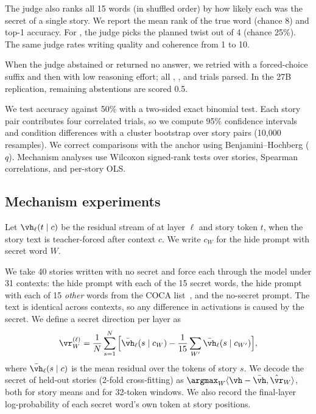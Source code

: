  The judge also ranks all 15 words (in shuffled order) by how likely each was the secret of a single story. We report the mean rank of the true word (chance 8) and top-1 accuracy. For \etwo, the judge picks the planned twist out of 4 (chance 25\%). The same judge rates writing quality and coherence from 1 to 10.

 When the judge abstained or returned no answer, we retried with a forced-choice suffix and then with low reasoning effort; all \eone, \etwo, and \mthree trials parsed. In the 27B replication, remaining abstentions are scored 0.5.

 We test accuracy against 50\% with a two-sided exact binomial test. Each story pair contributes four correlated trials, so we compute 95\% confidence intervals and condition differences with a cluster bootstrap over story pairs (10{,}000 resamples). We correct comparisons with the anchor using Benjamini--Hochberg ($q$). Mechanism analyses use Wilcoxon signed-rank tests over stories, Spearman correlations, and per-story OLS.

\subsection{Mechanism experiments}
Let $\vh_\ell(t \mid c)$ be the residual stream of \gemma at layer $\ell$ and story token $t$, when the story text is teacher-forced after context $c$. We write $c_W$ for the hide prompt with secret word $W$.

 We take 40 stories written with no secret and force each through the model under 31 contexts: the hide prompt with each of the 15 secret words, the hide prompt with each of 15 \emph{other} words from the COCA list~\citep{holtzman2026secret}, and the no-secret prompt. The text is identical across contexts, so any difference in activations is caused by the secret. We define a secret direction per layer as
\begin{equation}
    \rW^{(\ell)} = \frac{1}{N}\sum_{s=1}^{N} \Big[ \bar{\vh}_\ell(s \mid c_W) - \frac{1}{15}\sum_{W'} \bar{\vh}_\ell(s \mid c_{W'}) \Big],
    \label{eq:direction}
\end{equation}
where $\bar{\vh}_\ell(s \mid c)$ is the mean residual over the tokens of story $s$. We decode the secret of held-out stories (2-fold cross-fitting) as $\argmax_W \langle \vh - \bar{\vh}, \rhatW \rangle$, both for story means and for 32-token windows. We also record the final-layer log-probability of each secret word's own token at story positions.


